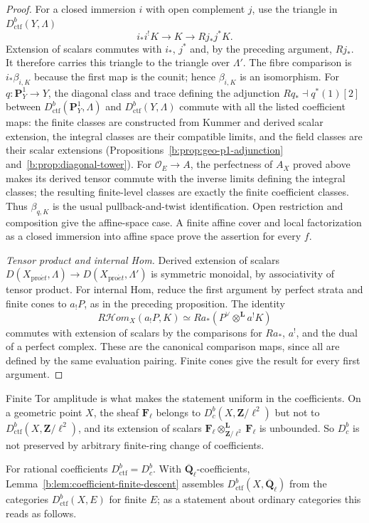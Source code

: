\documentclass[11pt,a4paper]{article}
\numberwithin{equation}{section}
\theoremstyle{definition}
\theoremstyle{remark}
\newcommand{\Dbc}{D^b_c}
\newcommand{\cHom}{R\mathcal{H}\!om}
\newcommand{\Qbar}{\overline{\mathbf Q}_\ell}
\newcommand{\proet}{\mathrm{pro}\acute{e}t}
\newcommand{\Dctf}{D^b_{\mathrm{ctf}}}
\begin{document}
\begin{proof}
For a closed immersion $i$ with open complement $j$, use the triangle
in $\Dctf(Y,\Lambda)$
\[
 i_*i^!K\longrightarrow K\longrightarrow Rj_*j^*K.
\]
Extension of scalars commutes with $i_*$, $j^*$ and, by the preceding
argument, $Rj_*$. It therefore carries this triangle to the triangle
over $\Lambda'$. The fibre comparison is $i_*\beta_{i,K}$ because
the first map is the counit; hence $\beta_{i,K}$ is an isomorphism.
For $q:\mathbf P^1_Y\to Y$, the diagonal class and trace defining
the adjunction $Rq_*\dashv q^*(1)[2]$ between $\Dctf(\mathbf P^1_Y,\Lambda)$
and $\Dctf(Y,\Lambda)$ commute with all the listed coefficient maps:
the finite classes are constructed from Kummer and derived scalar
extension, the integral classes are their compatible limits, and
the field classes are their scalar extensions
(Propositions~\ref{b:prop:geo-p1-adjunction}
and~\ref{b:prop:diagonal-tower}). For $\mathcal O_E\to A$, the
perfectness of $A_X$ proved above makes its derived tensor commute
with the inverse limits defining the integral classes; the resulting
finite-level classes are exactly the finite coefficient classes.
Thus $\beta_{q,K}$ is the usual
pullback-and-twist identification. Open restriction and composition
give the affine-space case. A finite affine cover and local
factorization as a closed immersion into affine space prove the
assertion for every $f$.

\emph{Tensor product and internal Hom.}
Derived extension of scalars
$D(X_{\proet},\Lambda)\to D(X_{\proet},\Lambda')$ is symmetric monoidal,
by associativity of tensor product. For internal Hom, reduce the first argument by
perfect strata and finite cones to $a_!P$, as in the preceding
proposition. The identity
\[
 \cHom_X(a_!P,K)
    \simeq Ra_*(P^\vee\otimes^{\mathbf L}a^!K)
\]
commutes with extension of scalars by the comparisons for $Ra_*$,
$a^!$, and the dual of a perfect complex. These are the canonical
comparison maps, since all are defined by the same evaluation
pairing. Finite cones give the result for every first argument.
\end{proof}

Finite Tor amplitude is what makes the statement uniform in the
coefficients. On a geometric point $X$, the sheaf $\mathbf F_\ell$
belongs to $\Dbc(X,\mathbf Z/\ell^2)$ but not to
$\Dctf(X,\mathbf Z/\ell^2)$, and its extension of scalars
$\mathbf F_\ell\otimes^{\mathbf L}_{\mathbf Z/\ell^2}\mathbf F_\ell$ is
unbounded. So $\Dbc$ is not preserved by arbitrary finite-ring change of
coefficients.

For rational coefficients $\Dctf=\Dbc$. With $\Qbar$-coefficients,
Lemma~\ref{b:lem:coefficient-finite-descent} assembles $\Dctf(X,\Qbar)$
from the categories $\Dctf(X,E)$ for finite $E$; as a statement about
ordinary categories this reads as follows.
\end{document}
